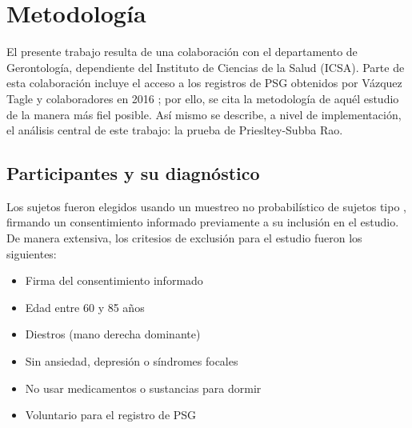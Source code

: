 \documentclass[12pt,a4paper]{mitthesis}
\begin{document}

\chapter{Metodolog\'ia}

El presente trabajo resulta de una colaboraci\'on con el departamento de Gerontolog\'ia, 
dependiente del Instituto de Ciencias de la Salud (ICSA).
Parte de esta colaboraci\'on incluye el acceso a los registros de PSG obtenidos por V\'azquez Tagle 
y colaboradores en 2016 \cite{VazquezTagle16}; por ello, se cita la metodolog\'ia de aqu\'el 
estudio de la manera m\'as fiel posible.
As\'i mismo se describe, a nivel de implementaci\'on, el an\'alisis central de este trabajo: la 
prueba de Priesltey-Subba Rao. 


\section{Participantes y su diagn\'ostico}

Los sujetos fueron elegidos usando un muestreo no probabilístico de sujetos tipo \cite{Garcia09},
firmando un consentimiento informado previamente a su inclusi\'on en el estudio. 
De manera extensiva, los critesios de exclusi\'on para el estudio fueron los siguientes:
\begin{itemize}
\item Firma del consentimiento informado
\item Edad entre 60 y 85 a\~nos
\item Diestros (mano derecha dominante)
\item Sin ansiedad, depresi\'on o s\'indromes focales
\item No usar medicamentos o sustancias para dormir
\item Voluntario para el registro de PSG
\end{itemize}
\end{document}
